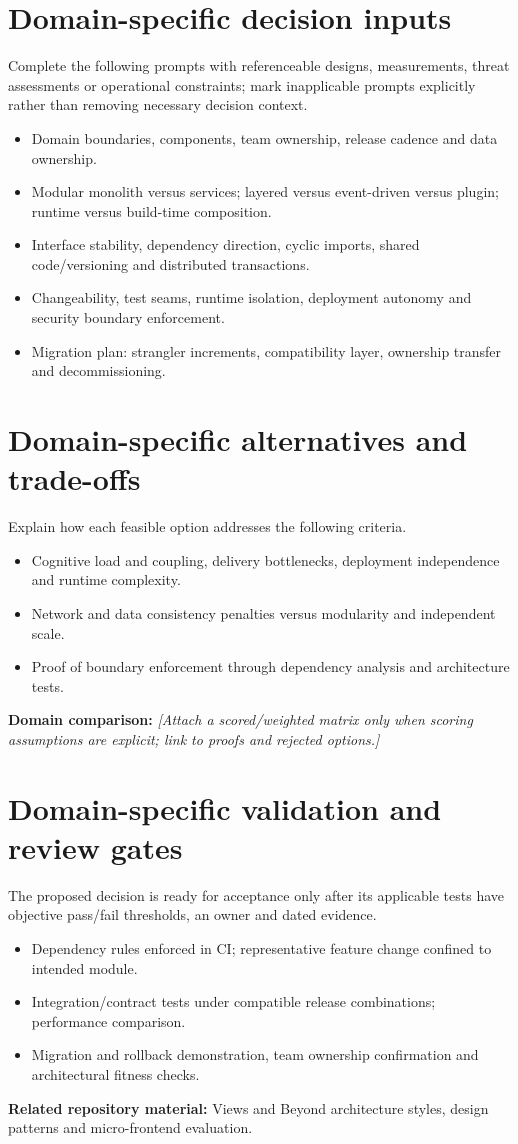 \documentclass[11pt,letterpaper]{article}
\begin{document}
\section{Domain-specific decision inputs}
Complete the following prompts with referenceable designs, measurements,
threat assessments or operational constraints; mark inapplicable prompts
explicitly rather than removing necessary decision context.
\begin{itemize}
\item Domain boundaries, components, team ownership, release cadence and data ownership.
\item Modular monolith versus services; layered versus event-driven versus plugin; runtime versus build-time composition.
\item Interface stability, dependency direction, cyclic imports, shared code/versioning and distributed transactions.
\item Changeability, test seams, runtime isolation, deployment autonomy and security boundary enforcement.
\item Migration plan: strangler increments, compatibility layer, ownership transfer and decommissioning.
\end{itemize}
\section{Domain-specific alternatives and trade-offs}
Explain how each feasible option addresses the following criteria.
\begin{itemize}
\item Cognitive load and coupling, delivery bottlenecks, deployment independence and runtime complexity.
\item Network and data consistency penalties versus modularity and independent scale.
\item Proof of boundary enforcement through dependency analysis and architecture tests.
\end{itemize}
\noindent\textbf{Domain comparison:} \emph{[Attach a scored/weighted matrix only
when scoring assumptions are explicit; link to proofs and rejected options.]}
\section{Domain-specific validation and review gates}
The proposed decision is ready for acceptance only after its applicable
tests have objective pass/fail thresholds, an owner and dated evidence.
\begin{itemize}
\item Dependency rules enforced in CI; representative feature change confined to intended module.
\item Integration/contract tests under compatible release combinations; performance comparison.
\item Migration and rollback demonstration, team ownership confirmation and architectural fitness checks.
\end{itemize}
\noindent\textbf{Related repository material:} Views and Beyond architecture styles, design patterns and micro-frontend evaluation.
\end{document}
